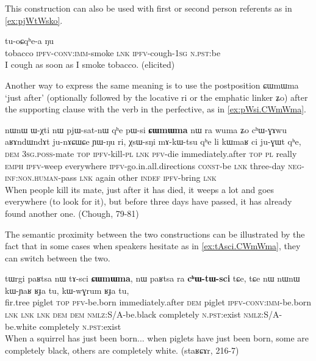 \documentclass[oldfontcommands,oneside,a4paper,11pt]{article}
\newcommand{\ipa}[1]{{\phon \mbox{#1}}} %
\begin{document}
This construction can also be used with first or second person referents as in \ref{ex:pjWtWsko}.
 \begin{exe}
\ex \label{ex:pjWtWsko} 
\gll 
[\ipa{thamakʰa}   	\textbf{\ipa{pjɯ-tɯ-sko}}]   	\ipa{tɕe}   	\ipa{tu-oɕqʰe-a}   	\ipa{ŋu}   	\\
tobacco \textsc{ipfv-conv:imm}-smoke \textsc{lnk} \textsc{ipfv}-cough-\textsc{1sg} \textsc{n.pst}:be \\
 \glt I cough as soon as I smoke tobacco. (elicited)
\end{exe}

Another way to express the same meaning is to use the postposition \ipa{ɕɯmɯma}   `just after' (optionally followed by the locative \ipa{ri} or the emphatic linker \ipa{ʑo}) after the supporting clause with the verb in the perfective, as in \ref{ex:pWsi.CWmWma}.

 \begin{exe}
\ex \label{ex:pWsi.CWmWma} 
\gll 
\ipa{nɯnɯ}   	\ipa{ɯ-χti}   	\ipa{nɯ}   	\ipa{pjɯ-sat-nɯ}   	\ipa{qʰe}   	\ipa{pɯ-si}   	\ipa{\textbf{ɕɯmɯma}}   	\ipa{nɯ} \ipa{ra}   	\ipa{wuma}   	\ipa{ʑo}   	\ipa{cʰɯ-ɣɤwu}   	\ipa{aʁɤndɯndɤt}   	\ipa{ju-nɤɕɯɕe}   	\ipa{ɲɯ-ŋu}   	\ipa{ri,}   	\ipa{χsɯ-sŋi}   	\ipa{mɤ-kɯ-tsu}   	\ipa{qʰe}   	\ipa{li}   	\ipa{kɯmaʁ}   	\ipa{ci}   	\ipa{ju-ɣɯt}   	\ipa{qʰe,}   \\
\textsc{dem} \textsc{3sg.poss}-mate \textsc{top} \textsc{ipfv}-kill-\textsc{pl} \textsc{lnk} \textsc{pfv}-die  immediately.after \textsc{top} \textsc{pl} really \textsc{emph} \textsc{ipfv}-weep everywhere \textsc{ipfv}-go.in.all.directions \textsc{const}-be \textsc{lnk} three-day \textsc{neg-inf:non.human}-pass \textsc{lnk} again other \textsc{indef} \textsc{ipfv}-bring \textsc{lnk} \\
\glt When people kill its mate, just after it has died, it weeps a lot and goes everywhere (to look for it), but before three days have passed, it has already found another one. (Chough, 79-81)
\end{exe}

The semantic proximity between the two constructions can be illustrated by the fact that in some cases when speakers hesitate as in \ref{ex:tAsci.CWmWma}, they can switch between the two.

 \begin{exe}
\ex \label{ex:tAsci.CWmWma} 
\gll 
\ipa{tɯrgi}   	\ipa{paʁtsa}   	\ipa{nɯ}   	\ipa{tɤ-sci}   	\ipa{\textbf{ɕɯmɯma},}   
\ipa{nɯ}   	\ipa{paʁtsa}   	\ipa{ra}   	\ipa{\textbf{cʰɯ-tɯ-sci}}   	\ipa{tɕe,}   	\ipa{tɕe}   	\ipa{nɯ}   
\ipa{nɯnɯ}   	\ipa{kɯ-ɲaʁ}   	\ipa{ʁɟa}   	\ipa{tu,}   	\ipa{kɯ-wɣrum}   	\ipa{ʁɟa}   	\ipa{tu,}   \\
fir.tree piglet \textsc{top} \textsc{pfv}-be.born immediately.after \textsc{dem} piglet \textsc{ipfv-conv:imm}-be.born \textsc{lnk} \textsc{lnk} \textsc{lnk} \textsc{dem} \textsc{dem} \textsc{nmlz}:S/A-be.black completely \textsc{n.pst}:exist \textsc{nmlz}:S/A-be.white completely \textsc{n.pst}:exist \\
\glt When a squirrel has just been born... when piglets have just been born, some are completely black, others are completely white. (staʁɕɤr, 216-7)
\end{exe}
\end{document}
